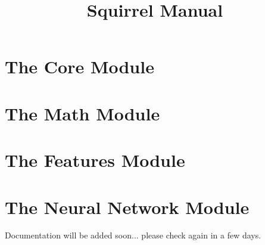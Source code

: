 \documentclass[a4paper, 10pt]{scrreprt}
\begin{document}
\title{Squirrel Manual}
\maketitle

\tableofcontents

\chapter{The Core Module}


\chapter{The Math Module}


\chapter{The Features Module}


\chapter{The Neural Network Module}

Documentation will be added soon... please check again in a few days.
\end{document}
